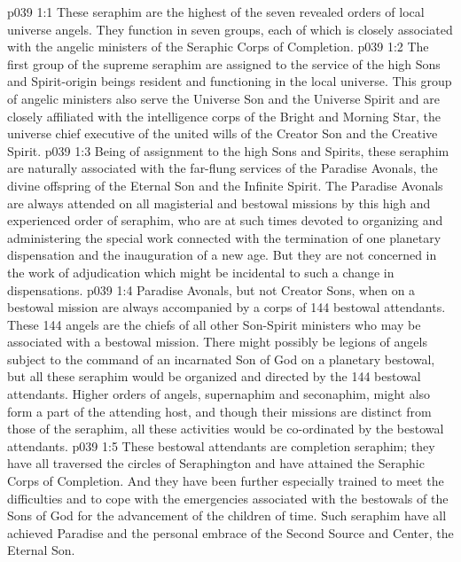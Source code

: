 \vs p039 1:1 These seraphim are the highest of the seven revealed orders of local universe angels. They function in seven groups, each of which is closely associated with the angelic ministers of the Seraphic Corps of Completion.
\vs p039 1:2 \pc {}\bibnobreakspace {} The first group of the supreme seraphim are assigned to the service of the high Sons and Spirit\hyp{}origin beings resident and functioning in the local universe. This group of angelic ministers also serve the Universe Son and the Universe Spirit and are closely affiliated with the intelligence corps of the Bright and Morning Star, the universe chief executive of the united wills of the Creator Son and the Creative Spirit.
\vs p039 1:3 Being of assignment to the high Sons and Spirits, these seraphim are naturally associated with the far\hyp{}flung services of the Paradise Avonals, the divine offspring of the Eternal Son and the Infinite Spirit. The Paradise Avonals are always attended on all magisterial and bestowal missions by this high and experienced order of seraphim, who are at such times devoted to organizing and administering the special work connected with the termination of one planetary dispensation and the inauguration of a new age. But they are not concerned in the work of adjudication which might be incidental to such a change in dispensations.
\vs p039 1:4 \pc {} Paradise Avonals, but not Creator Sons, when on a bestowal mission are always accompanied by a corps of 144 bestowal attendants. These 144 angels are the chiefs of all other Son\hyp{}Spirit ministers who may be associated with a bestowal mission. There might possibly be legions of angels subject to the command of an incarnated Son of God on a planetary bestowal, but all these seraphim would be organized and directed by the 144 bestowal attendants. Higher orders of angels, supernaphim and seconaphim, might also form a part of the attending host, and though their missions are distinct from those of the seraphim, all these activities would be co\hyp{}ordinated by the bestowal attendants.
\vs p039 1:5 These bestowal attendants are completion seraphim; they have all traversed the circles of Seraphington and have attained the Seraphic Corps of Completion. And they have been further especially trained to meet the difficulties and to cope with the emergencies associated with the bestowals of the Sons of God for the advancement of the children of time. Such seraphim have all achieved Paradise and the personal embrace of the Second Source and Center, the Eternal Son.
